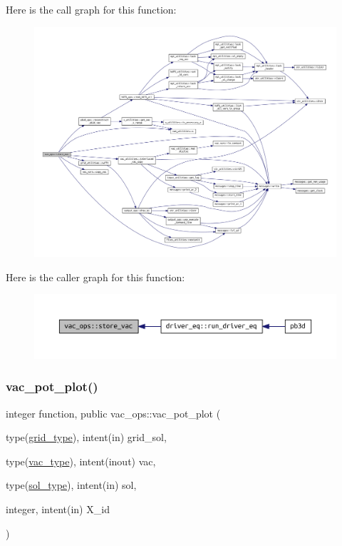 Here is the call graph for this function\+:\nopagebreak
\begin{figure}[H]
\begin{center}
\leavevmode
\includegraphics[width=350pt]{namespacevac__ops_a37220702fbf378626a0f2c12f446e0aa_cgraph}
\end{center}
\end{figure}
Here is the caller graph for this function\+:\nopagebreak
\begin{figure}[H]
\begin{center}
\leavevmode
\includegraphics[width=350pt]{namespacevac__ops_a37220702fbf378626a0f2c12f446e0aa_icgraph}
\end{center}
\end{figure}
\mbox{\label{namespacevac__ops_a3a2a3aed45951aecef42197b82a5a6da}} 
\subsubsection{\texorpdfstring{vac\+\_\+pot\+\_\+plot()}{vac\_pot\_plot()}}
{\footnotesize\ttfamily integer function, public vac\+\_\+ops\+::vac\+\_\+pot\+\_\+plot (\begin{DoxyParamCaption}\item[{type(\hyperlink{structgrid__vars_1_1grid__type}{grid\+\_\+type}), intent(in)}]{grid\+\_\+sol,  }\item[{type(\hyperlink{structvac__vars_1_1vac__type}{vac\+\_\+type}), intent(inout)}]{vac,  }\item[{type(\hyperlink{structsol__vars_1_1sol__type}{sol\+\_\+type}), intent(in)}]{sol,  }\item[{integer, intent(in)}]{X\+\_\+id }\end{DoxyParamCaption})}



